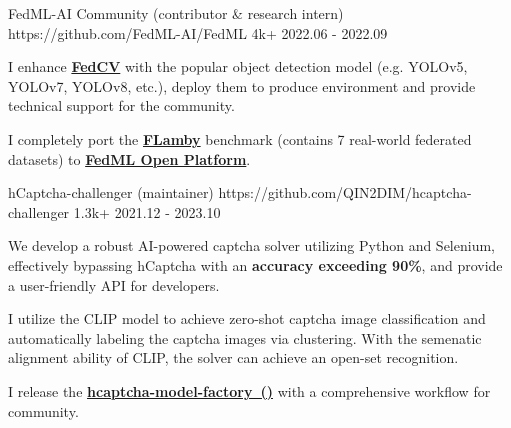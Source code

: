 {}

\begin{cventries}

\cvproject
{FedML-AI Community (contributor \& research intern)} %
{https://github.com/FedML-AI/FedML} %
{4k+} %
{2022.06 - 2022.09} %
{
\begin{cvitems} %
\item {I enhance \href{https://github.com/FedML-AI/FedCV}{\textbf{FedCV}} with the popular object detection model (e.g. YOLOv5, YOLOv7, YOLOv8, etc.), deploy them to produce environment and provide technical support for the community.}
\item {I completely port the \href{https://github.com/owkin/FLamby}{\textbf{FLamby}} benchmark (contains 7 real-world federated datasets) to \href{https://open.fedml.ai/}{\textbf{FedML Open Platform}}.}
\end{cvitems}
} %



\cvproject
{hCaptcha-challenger (maintainer)} %
{https://github.com/QIN2DIM/hcaptcha-challenger} %
{1.3k+} %
{2021.12 - 2023.10} %
{
\begin{cvitems} %
\item {We develop a robust AI-powered captcha solver utilizing Python and Selenium, effectively bypassing hCaptcha with an \textbf{accuracy exceeding 90\%}, and provide a user-friendly API for developers.}
\item {I utilize the CLIP model to achieve zero-shot captcha image classification and automatically labeling the captcha images via clustering. With the semenatic alignment ability of CLIP, the solver can achieve an open-set recognition.}
\item {I release the \href{https://github.com/CaptchaAgent/hcaptcha-model-factory}{\textbf{hcaptcha-model-factory~()}} with a comprehensive workflow for community.}
\end{cvitems}
} %



\end{cventries}
